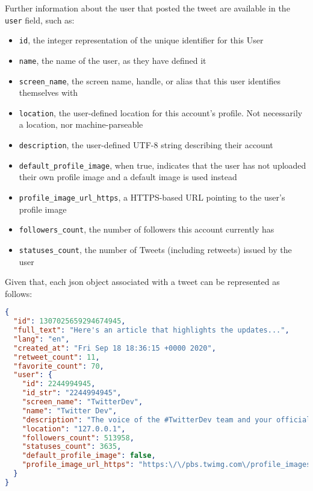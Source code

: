 Further information about the user that posted the tweet are available in the \texttt{user} field, such as:

\begin{itemize}
	\item \texttt{id}, the integer representation of the unique identifier for this User
	\item \texttt{name}, the name of the user, as they have defined it
	\item \texttt{screen\_name}, the screen name, handle, or alias that this user identifies themselves with
	\item \texttt{location}, the user-defined location for this account's profile. Not necessarily a location, nor machine-parseable
	\item \texttt{description}, the user-defined UTF-8 string describing their account
	\item \texttt{default\_profile\_image}, when true, indicates that the user has not uploaded their own profile image and a default image is used instead
	\item \texttt{profile\_image\_url\_https}, a HTTPS-based URL pointing to the user's profile image
	\item \texttt{followers\_count}, the number of followers this account currently has
	\item \texttt{statuses\_count}, the number of Tweets (including retweets) issued by the user
\end{itemize}

Given that, each json object associated with a tweet can be represented as follows:

\begin{lstlisting}[language=json, caption={Final json object for a Tweet}, captionpos=b, label={lst:tweet_json}]
{
  "id": 1307025659294674945,
  "full_text": "Here's an article that highlights the updates...",
  "lang": "en",
  "created_at": "Fri Sep 18 18:36:15 +0000 2020",
  "retweet_count": 11,
  "favorite_count": 70,
  "user": {
    "id": 2244994945,
    "id_str": "2244994945",
    "screen_name": "TwitterDev",
    "name": "Twitter Dev",
    "description": "The voice of the #TwitterDev team and your official...",
    "location": "127.0.0.1",
    "followers_count": 513958,
    "statuses_count": 3635,
    "default_profile_image": false,
    "profile_image_url_https": "https:\/\/pbs.twimg.com\/profile_images\/1283786620521652229\/lEODkLTh_normal.jpg"
  }
}
\end{lstlisting}



